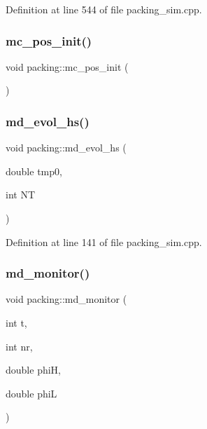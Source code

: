 Definition at line 544 of file packing\+\_\+sim.\+cpp.

\mbox{\label{classpacking_a706d5c77cb054dadbf181fe1b68c6eda}} 
\subsubsection{\texorpdfstring{mc\+\_\+pos\+\_\+init()}{mc\_pos\_init()}}
{\footnotesize\ttfamily void packing\+::mc\+\_\+pos\+\_\+init (\begin{DoxyParamCaption}{ }\end{DoxyParamCaption})}

\mbox{\label{classpacking_a4a4cc64305d5f1726e1a49e5a395f7e9}} 
\subsubsection{\texorpdfstring{md\+\_\+evol\+\_\+hs()}{md\_evol\_hs()}}
{\footnotesize\ttfamily void packing\+::md\+\_\+evol\+\_\+hs (\begin{DoxyParamCaption}\item[{double}]{tmp0,  }\item[{int}]{NT }\end{DoxyParamCaption})}



Definition at line 141 of file packing\+\_\+sim.\+cpp.

\mbox{\label{classpacking_af2e5ff650c513fb8f69e0c1dd97a7ec7}} 
\subsubsection{\texorpdfstring{md\+\_\+monitor()}{md\_monitor()}}
{\footnotesize\ttfamily void packing\+::md\+\_\+monitor (\begin{DoxyParamCaption}\item[{int}]{t,  }\item[{int}]{nr,  }\item[{double}]{phiH,  }\item[{double}]{phiL }\end{DoxyParamCaption})}



